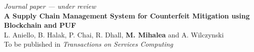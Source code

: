 
\bigskip
{}%
\emph{Journal paper --- under review}\\
\textbf{A Supply Chain Management System for Counterfeit Mitigation using Blockchain and PUF}\\
L. Aniello, B. Halak, P. Chai, R. Dhall, \textbf{M. Mihalea} and A. Wilczynski\\
To be published in \emph{Transactions on Services Computing}
